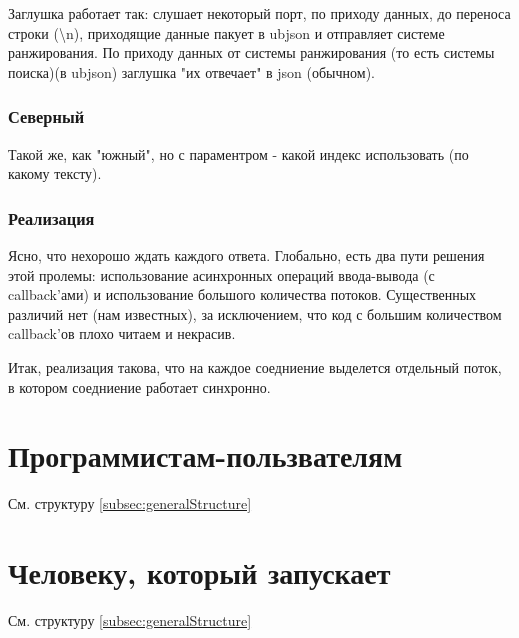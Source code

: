 \documentclass[12pt,a4paper]{article}
\begin{document}
Заглушка работает так: слушает некоторый порт, по приходу данных, до переноса строки (\backslash n), приходящие данные пакует в ubjson и отправляет системе ранжирования. По приходу данных от системы ранжирования (то есть системы поиска)(в ubjson) заглушка "их отвечает" в json (обычном).

\subsubsection{Северный}
Такой же, как "южный", но с параментром - какой индекс использовать (по какому тексту). 

\subsubsection{Реализация}
Ясно, что нехорошо ждать каждого ответа. 
Глобально, есть два пути решения этой пролемы: использование асинхронных операций ввода-вывода (с callback'ами) и использование большого количества потоков. Существенных различий нет (нам известных), за исключением, что код с большим количеством callback'ов плохо читаем и некрасив.

Итак, реализация такова, что на каждое соедниение выделется отдельный поток, в котором соедниение работает синхронно.

\section{Программистам-пользвателям}
См. структуру \ref{subsec:generalStructure}

\section{Человеку, который запускает}
См. структуру \ref{subsec:generalStructure}
\end{document}
